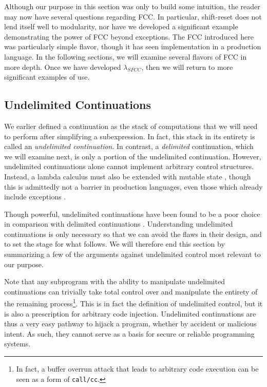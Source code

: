 \documentclass[11pt]{article}
\newcommand{\maybePage}{\newpage}
\begin{document}
Although our purpose in this section was only to build some intuition, the reader may now have several questions regarding FCC.
In particular, shift-reset does not lend itself well to modularity, nor have we developed a significant example demonstrating the power of FCC beyond exceptions.
The FCC introduced here was particularly simple flavor, though it has seen implementation in a production language.
In the following sections, we will examine several flavors of FCC in more depth.
Once we have developed $\lambda_{SFCC}$, then we will return to more significant examples of use.


\maybePage
\subsection{Undelimited Continuations}
\label{undelimControl}

We earlier defined a continuation as the stack of computations that we will need to perform after simplifying a subexpression.
In fact, this stack in its entirety is called an \emph{undelimited continuation}.
In contrast, a \emph{delimited} continuation, which we will examine next, is only a portion of the undelimited continuation.
However, undelimited continuations alone cannot implement arbitrary control structures.
Instead, a lambda calculus must also be extended with mutable state \cite{Filinski94}, though this is admittedly not a barrier in production languages, even those which already include exceptions \cite{GreatEscape}.

Though powerful, undelimited continuations have been found to be a poor choice in comparison with delimited continuations \cite{MFDC}\cite{continuationsInProcObjs}\cite{HandlingControl}\cite{Sitaram90}.
Understanding undelimited continuations is only necessary so that we can avoid the flaws in their design, and to set the stage for what follows.
We will therefore end this section by summarizing a few of the arguments against undelimited control most relevant to our purpose.

Note that any subprogram with the ability to manipulate undelimited continuations can trivially take total control over and manipulate the entirety of the remaining process\footnote{In fact, a buffer overrun attack that leads to arbitrary code execution can be seen as a form of \texttt{call/cc}.}.
This is in fact the definition of undelimited control, but it is also a prescription for arbitrary code injection.
Undelimited continuations are thus a very easy pathway to hijack a program, whether by accident or malicious intent.
As such, they cannot serve as a basis for secure or reliable programming systems.
\end{document}
